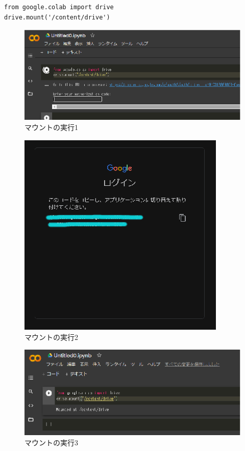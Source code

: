 \documentclass[a4j]{jarticle}
\begin{document}
      \begin{lstlisting}[basicstyle=\ttfamily\footnotesize, frame=single,label=mount,caption=マウントのためのコード]
from google.colab import drive
drive.mount('/content/drive')
      \end{lstlisting}

    \begin{figure}[H]
      \centering
      \includegraphics[scale=2.0]{colab-mount.eps}
      \caption{マウントの実行1}
       \label{colab-mount1}
      \end{figure}

    \begin{figure}[H]
      \centering
      \includegraphics[scale=2.0]{colab-code.eps}
      \caption{マウントの実行2}
       \label{colab-mount2}
      \end{figure}

    \begin{figure}[H]
      \centering
      \includegraphics[scale=2.0]{colab-auth.eps}
      \caption{マウントの実行3}
       \label{colab-mount3}
      \end{figure}
\end{document}
